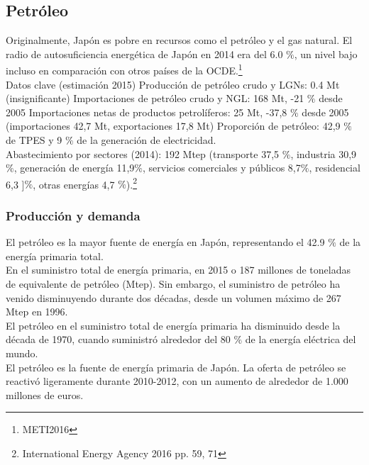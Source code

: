 \documentclass[]{article}
\begin{document}
\subsection{Petróleo}

Originalmente, Japón es pobre en recursos como el petróleo y el gas natural. El radio de autosuficiencia energética de Japón en 2014 era del 6.0 $\%$, un nivel bajo incluso en comparación con otros países de la OCDE.\citep{METI2016}\footnote{METI2016}\\

Datos clave (estimación 2015) Producción de petróleo crudo y LGNs: 0.4 Mt (insignificante) Importaciones de petróleo crudo y NGL: 168 Mt, -21 $\%$ desde 2005 Importaciones netas de productos petrolíferos: 25 Mt, -37,8 $\%$ desde 2005 (importaciones 42,7 Mt, exportaciones 17,8 Mt) Proporción de petróleo: 42,9 $\%$ de TPES y 9 $\%$ de la generación de electricidad.\\

Abastecimiento por sectores (2014): 192 Mtep (transporte 37,5 $\%$, industria 30,9$\%$, generación de energía 11,9$\%$, servicios comerciales y públicos 8,7$\%$, residencial 6,3 ]$\%$, otras energías 4,7 $\%$).\citep{InternationalEnergyAgency2016}\footnote{International Energy Agency 2016 pp. 59, 71}\\


\subsubsection{Producción y demanda}

El petróleo es la mayor fuente de energía en Japón, representando el 42.9 $\%$ de la energía primaria total.\\
En el suministro total de energía primaria, en 2015 o 187 millones de toneladas de equivalente de petróleo (Mtep). Sin embargo, el suministro de petróleo ha venido disminuyendo durante dos décadas, desde un volumen máximo de 267 Mtep en 1996.\\
 
El petróleo en el suministro total de energía primaria ha disminuido desde la década de 1970, cuando suministró alrededor del 80 $\%$ de la energía eléctrica del mundo.\\

El petróleo es la fuente de energía primaria de Japón. La oferta de petróleo se reactivó ligeramente durante 2010-2012, con un aumento de alrededor de 1.000 millones de euros.\\
\end{document}
